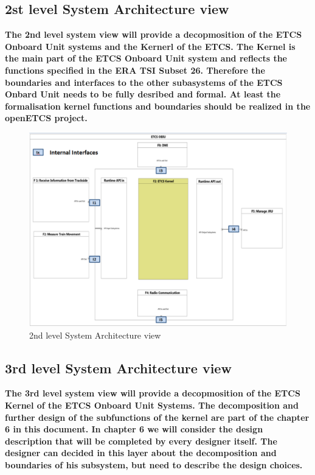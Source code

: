 \newpage
\subsection{2st level System Architecture view}
\textbf{The 2nd level system view will provide a decopmosition of the ETCS Onboard Unit systems and the Kernerl of the ETCS. The Kernel is the main part of the ETCS Onboard Unit system and reflects the functions specified in the ERA TSI Subset 26. Therefore the boundaries and interfaces to the other subasystems of the ETCS Onbard Unit needs to be fully desribed and formal. At least the formalisation kernel functions and boundaries should be realized in the openETCS project.}

\begin{figure}[h]
\centering
\includegraphics[scale=0.6]{images/2ndlevelarchitecture}
\caption{2nd level System Architecture view}
\label{2nd level System Architecture view}
\end{figure}

\subsection{3rd level System Architecture view}
\textbf{The 3rd level system view will provide a decopmosition of the ETCS Kernel of the ETCS Onboard Unit Systems. The decomposition and further design of the subfunctions of the kernel are part of the chapter 6 in this document. In chapter 6 we will consider the design description that will be completed by every designer itself. The designer can decided in this layer about the decomposition and boundaries of his subsystem, but need to describe the design choices.}

